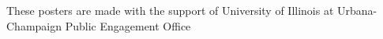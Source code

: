 \documentclass[leqno,presentation]{beamer}
\begin{document}
\begin{frame}
\begin{columns}[t]
\begin{column}{.25\linewidth}


\end{column}

\end{columns}
  \begin{block}{}
   \begin{center}
   These posters are made with the support of University of Illinois at Urbana-Champaign Public Engagement Office
  \end{center}
  \end{block}



\end{frame}
\end{document}
